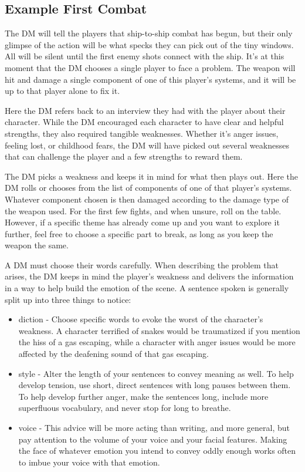 \documentclass[a4paper]{article}
\begin{document}
\subsection{Example First Combat}

The DM will tell the players that ship-to-ship combat has begun, but their only glimpse of the action will be what specks they can pick out of the tiny windows. All will be silent until the first enemy shots connect with the ship. It's at this moment that the DM chooses a single player to face a problem. The weapon will hit and damage a single component of one of this player's systems, and it will be up to that player alone to fix it.

Here the DM refers back to an interview they had with the player about their character. While the DM encouraged each character to have clear and helpful strengths, they also required tangible weaknesses. Whether it's anger issues, feeling lost, or childhood fears, the DM will have picked out several weaknesses that can challenge the player and a few strengths to reward them.

The DM picks a weakness and keeps it in mind for what then plays out. Here the DM rolls or chooses from the list of components of one of that player's systems. Whatever component chosen is then damaged according to the damage type of the weapon used. For the first few fights, and when unsure, roll on the table. However, if a specific theme has already come up and you want to explore it further, feel free to choose a specific part to break, as long as you keep the weapon the same.

A DM must choose their words carefully. When describing the problem that arises, the DM keeps in mind the player's weakness and delivers the information in a way to help build the emotion of the scene. A sentence spoken is generally split up into three things to notice:
\begin{itemize}
\item diction - Choose specific words to evoke the worst of the character's weakness. A character terrified of snakes would be traumatized if you mention the hiss of a gas escaping, while a character with anger issues would be more affected by the deafening sound of that gas escaping.
\item style - Alter the length of your sentences to convey meaning as well. To help develop tension, use short, direct sentences with long pauses between them. To help develop further anger, make the sentences long, include more superfluous vocabulary, and never stop for long to breathe.
\item voice - This advice will be more acting than writing, and more general, but pay attention to the volume of your voice and your facial features. Making the face of whatever emotion you intend to convey oddly enough works often to imbue your voice with that emotion.
\end{itemize}
\end{document}
